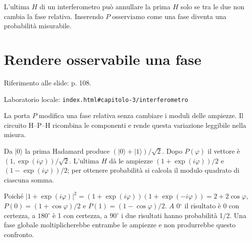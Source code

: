 L'ultima \(H\) di un interferometro può annullare la prima \(H\) solo se tra le due non cambia la fase relativa. Inserendo \(P\) osserviamo come una fase diventa una probabilità misurabile.\par



\Needspace{.43\textheight}
\section{Rendere osservabile una fase}
\label{c3-interferometro}

{\sffamily\small\color{Ink!70} Riferimento alle slide: p. 108.\par}

{\sffamily\small\color{Ink!70} Laboratorio locale: \nolinkurl{index.html#capitolo-3/interferometro}\par}

La porta \(P\) modifica una fase relativa senza cambiare i moduli delle ampiezze. Il circuito H--P--H ricombina le componenti e rende questa variazione leggibile nella misura.\par

Da \(|0\rangle \) la prima Hadamard produce \((|0\rangle +|1\rangle )/\sqrt{2}\). Dopo \(P(\varphi )\) il vettore è \((1,\allowbreak \allowbreak\exp (i\varphi ))/\sqrt{2}\). L'ultima \(H\) dà le ampiezze \((1+\allowbreak\exp (i\varphi ))/2\) e \((1- \allowbreak\exp (i\varphi ))/2\); per ottenere probabilità si calcola il modulo quadrato di ciascuna somma.\par

Poiché \(|1+\allowbreak\exp (i\varphi )|^{2}=(1+\allowbreak\exp (i\varphi ))(1+\allowbreak\exp (- i\varphi ))=2+2\cos \varphi \), \(P(0)=(1+\cos \varphi )/2\) e \(P(1)=(1- \cos \varphi )/2\). \(A\) \(0{}^{\circ} \) il risultato è 0 con certezza, a \(180{}^{\circ} \) è 1 con certezza, a \(90{}^{\circ} \) i due risultati hanno probabilità 1/2. Una fase globale moltiplicherebbe entrambe le ampiezze e non produrrebbe questo confronto.\par



